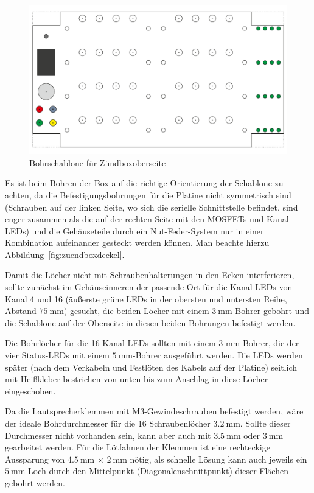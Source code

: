 \documentclass[paper=a4, parskip, numbers=noenddot, toc=listof, headsepline]{scrbook}
\begin{document}
					\begin{figure}
						\centering
						\includegraphics[angle=90,scale=1]{Bilder/Zuendboxbohrschablone}
						\caption{Bohrschablone für Zündboxoberseite}
						\label{fig:zuendboxbohren}
					\end{figure}

					Es ist beim Bohren der Box auf die richtige Orientierung der Schablone zu achten, da die Befestigungsbohrungen für die Platine nicht symmetrisch sind (Schrauben auf der linken Seite, wo sich die serielle Schnittstelle befindet, sind enger zusammen als die auf der rechten Seite mit den MOSFETs und Kanal-LEDs) und die Gehäuseteile durch ein Nut-Feder-System nur in einer Kombination aufeinander gesteckt werden können. Man beachte hierzu Abbildung~\ref{fig:zuendboxdeckel}.

					Damit die Löcher nicht mit Schraubenhalterungen in den Ecken interferieren, sollte zunächst im Gehäuseinneren der passende Ort für die Kanal-LEDs von Kanal 4 und 16 (äußerste grüne LEDs in der obersten und untersten Reihe, Abstand $\SI{75}{\milli\metre}$) gesucht, die beiden Löcher mit einem $\SI{3}{\milli\metre}$-Bohrer gebohrt und die Schablone auf der Oberseite in diesen beiden Bohrungen befestigt werden.

					Die Bohrlöcher für die 16 Kanal-LEDs sollten mit einem 3-mm-Bohrer, die der vier Status-LEDs mit einem $\SI{5}{\milli\metre}$-Bohrer ausgeführt werden. Die LEDs werden später (nach dem Verkabeln und Festlöten des Kabels auf der Platine) seitlich mit Heißkleber bestrichen von unten bis zum Anschlag in diese Löcher eingeschoben.

					Da die Lautsprecherklemmen mit M3-Gewindeschrauben befestigt werden, wäre der ideale Bohrdurchmesser für die 16 Schraubenlöcher $\SI{3,2}{\milli\metre}$. Sollte dieser Durchmesser nicht vorhanden sein, kann aber auch mit $\SI{3,5}{\milli\metre}$ oder $\SI{3}{\milli\metre}$ gearbeitet werden. Für die Lötfahnen der Klemmen ist eine rechteckige Aussparung von $\SI{4,5}{\milli\metre}\,\times\,\SI{2}{\milli\metre}$ nötig, als schnelle Lösung kann auch jeweils ein $\SI{5}{\milli\metre}$-Loch durch den Mittelpunkt (Diagonalenschnittpunkt) dieser Flächen gebohrt werden.
\end{document}
